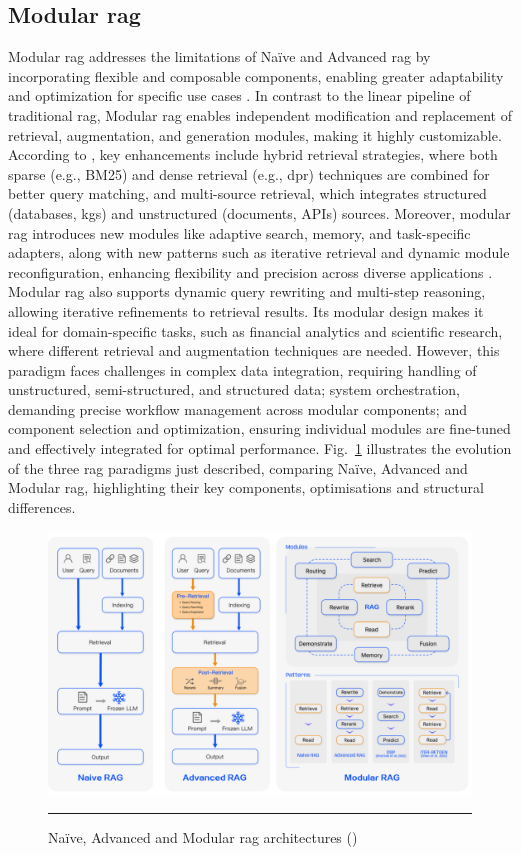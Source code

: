 \subsection*{Modular \gls{rag}}\label{sec:modular-rag}
Modular \gls{rag} addresses the limitations of Na\"ive and Advanced \gls{rag} by incorporating flexible and composable components, enabling greater adaptability and optimization for specific use cases \cite{gao_retrieval-augmented_2024}.
In contrast to the linear pipeline of traditional \gls{rag}, Modular \gls{rag} enables independent modification and replacement of retrieval, augmentation, and generation modules, making it highly customizable.
According to \cite{singh2025}, key enhancements include hybrid retrieval strategies, where both sparse (e.g., BM25) and dense retrieval \cite{Karpukhin2020} (e.g., \gls{dpr}) techniques are combined for better query matching, and multi-source retrieval, which integrates structured (databases, \glspl{kg}) and unstructured (documents, APIs) sources.
Moreover, modular \gls{rag} introduces new modules like adaptive search, memory, and task-specific adapters, along with new patterns such as iterative retrieval and dynamic module reconfiguration, enhancing flexibility and precision across diverse applications \cite{gao_retrieval-augmented_2024}.
Modular \gls{rag} also supports dynamic query rewriting and multi-step reasoning, allowing iterative refinements to retrieval results.
Its modular design makes it ideal for domain-specific tasks, such as financial analytics and scientific research, where different retrieval and augmentation techniques are needed.
However, this paradigm faces challenges in complex data integration, requiring handling of unstructured, semi-structured, and structured data; system orchestration, demanding precise workflow management across modular components; and component selection and optimization, ensuring individual modules are fine-tuned and effectively integrated for optimal performance.
Fig.~\ref{fig:naive-advanced-modular-rag} illustrates the evolution of the three \gls{rag} paradigms just described, comparing Na\"ive, Advanced and Modular \gls{rag}, highlighting their key components, optimisations and structural differences.
\begin{figure}[htbp]
    \centering
 \includegraphics[width=.75\textwidth]{figures/literature-review/naive-advanced-modular-rag.png}
     \rule{35em}{0.5pt}
    \caption{Na\"ive, Advanced and Modular \gls{rag} architectures (\textcite{gao_retrieval-augmented_2024})}
 \label{fig:naive-advanced-modular-rag}
\end{figure}

